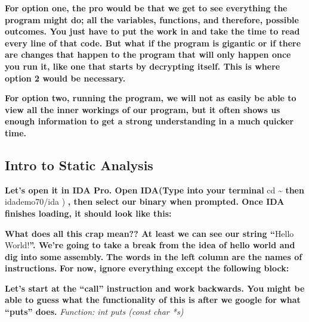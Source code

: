 \documentclass[letterpaper]{article}
\newcommand{\sitfig}[3]{
\begin{figure}[H]
\centering
\makebox[\textwidth][c]{
#2
}
\label{#1}
\end{figure}
}
\newcommand{\sitgfx}[4][scale=1.0]{
\sitfig{#3}{\texttt{[image: \#2]}}{#4}
}
\begin{document}
\textbf{For option one, the pro would be that we get to see everything the program might do; all the variables,
functions, and therefore, possible outcomes. You just have to put the work in and take the time to read every line of
that code. But what if the program is gigantic or if there are changes that happen to the program that will only happen
once you run it, like one that starts by decrypting itself. This is where option 2 would be necessary. }

{\centering
\textbf{\newline
For option two, running the program, we will not as easily be able to view all the inner workings of our program, but it
often shows us enough information to get a strong understanding in a much quicker time. \newline
}}

\subsection{Intro to Static Analysis}

\textbf{Let's open it in IDA Pro. Open IDA(Type into your terminal }cd \~{} \textbf{then }idademo70/ida )\textbf{ , then
select our binary when prompted. \newline
Once IDA finishes loading, it should look like this: }

{\centering   
\sitgfx[width=5.3957in,height=5.052in]{reversing-img009.png}{fig:unk}{TODO CAPTION}
 \par}
\textbf{What does all this crap mean?? At least we can see our string ``}Hello World!\textbf{{}''. \newline
We're going to take a break from the idea of hello world and dig into some
}\textbf{\textcolor[rgb]{0.07450981,0.30980393,0.36078432}{assembly.}}\textbf{ The words in the left column are the
names of }\textbf{\textcolor[rgb]{0.21960784,0.4627451,0.11372549}{instructions.}}\textbf{ For now, ignore everything
except the following block:}

{\centering
\textbf{\newline
\newline
 }  
\sitgfx[width=4.8126in,height=1.0209in]{reversing-img010.png}{fig:unk}{TODO CAPTION}
 
\par}

\textbf{Let's start at the ``call'' instruction and work backwards. You might be able to guess what the functionality of
this is after we google for what ``puts'' does.\newline
\newline
}\textit{Function: int puts (const char *s)}
\end{document}
